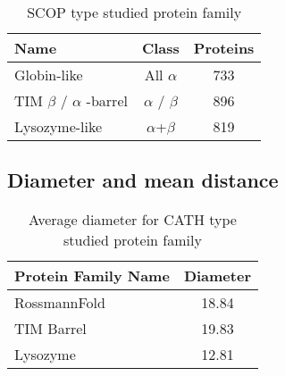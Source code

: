 \begin{table}
\centering
\begin {tabular}{ | l | c | c |}
\hline
Name & Class & Proteins \\ \hline
Globin-like & All $\alpha$ & 733 \\ \hline
TIM $\beta$ / $\alpha$ -barrel & $\alpha$ / $\beta$ & 896 \\ \hline
Lysozyme-like & $\alpha$+$\beta$ & 819 \\ \hline
\end {tabular}
\caption {SCOP type studied protein family}
\label {tab:scop_family}
\end{table}

\subsection{Diameter and mean distance}
\begin{table}
\centering
\begin {tabular}{ | l | c |}
\hline
Protein Family Name & Diameter \\ \hline
RossmannFold & 18.84 \\ \hline
TIM Barrel & 19.83 \\ \hline
Lysozyme & 12.81 \\ \hline
\end {tabular}
\caption {Average diameter for CATH type studied protein family}
\label {tab:diameter_cath_family}
\end{table}


